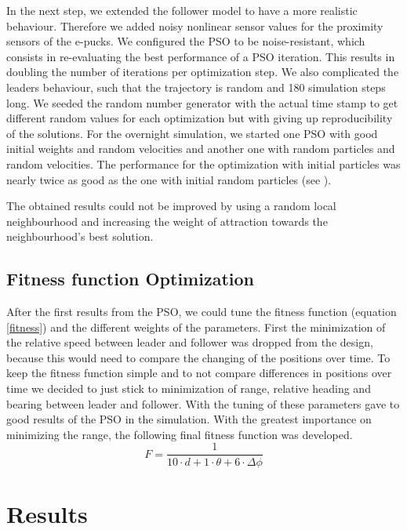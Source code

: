 \documentclass[a4paper, 10pt, conference]{ieeeconf}      %
\begin{document}
In the next step, we extended the follower model to have a more realistic behaviour. Therefore we added noisy nonlinear sensor values for the proximity sensors of the e-pucks. We configured the PSO to be noise-resistant, which consists in re-evaluating the best performance of a PSO iteration. This results in doubling the number of iterations per optimization step. We also complicated the leaders behaviour, such that the trajectory is random and 180 simulation steps long. We seeded the random number generator with the actual time stamp to get different random values for each optimization but with giving up reproducibility of the solutions. For the overnight simulation, we started one PSO with good initial weights and random velocities and another one with random particles and random velocities. The performance for the optimization with initial particles was nearly twice as good as the one with initial random particles (see \cite{c5}).

The obtained results could not be improved by using a random local neighbourhood and increasing the weight of attraction towards the neighbourhood's best solution.

\subsection{Fitness function Optimization}
After the first results from the PSO, we could tune the fitness function (equation \ref{fitness}) and the different weights of the parameters. First the minimization of the relative speed between leader and follower was dropped from the design, because this would need to compare the changing of the positions over time. To keep the fitness function simple and to not compare differences in positions over time we decided to just stick to minimization of range, relative heading and bearing between leader and follower. With the tuning of these parameters gave to good results of the PSO in the simulation. With the greatest importance on minimizing the range, the following final fitness function was developed.
\begin{equation}\label{fitnessFull}
F=\frac{1}{10 \cdot d+1 \cdot \theta+6 \cdot \Delta \phi}
\end{equation}


\section{Results}
\end{document}
